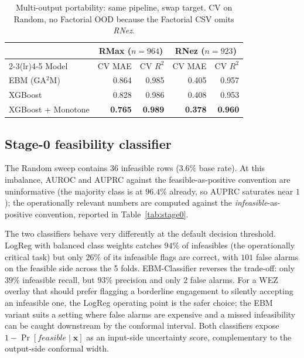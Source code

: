 \documentclass[conference]{IEEEtran}
\begin{document}
\begin{table}[t]
\centering
\caption{Multi-output portability: same pipeline, swap target. CV on Random, no Factorial OOD because the Factorial CSV omits \textit{RNez}.}
\label{tab:rnez}
\scriptsize
\setlength{\tabcolsep}{4pt}
\begin{tabular}{lrrrr}
\toprule
                  & \multicolumn{2}{c}{RMax ($n{=}964$)} & \multicolumn{2}{c}{RNez ($n{=}923$)} \\
\cmidrule(lr){2-3}\cmidrule(lr){4-5}
Model             & CV MAE & CV $R^2$ & CV MAE & CV $R^2$ \\
\midrule
EBM (GA$^2$M)        & 0.864 & 0.985 & 0.405 & 0.957 \\
XGBoost              & 0.828 & 0.986 & 0.408 & 0.953 \\
XGBoost + Monotone   & \textbf{0.765} & \textbf{0.989} & \textbf{0.378} & \textbf{0.960} \\
\bottomrule
\end{tabular}
\end{table}

\subsection{Stage-0 feasibility classifier}
\label{subsec:stage0}
The Random sweep contains $36$ infeasible rows ($3.6\%$ base rate). At this imbalance, AUROC and AUPRC against the feasible-as-positive convention are uninformative (the majority class is at $96.4\%$ already, so AUPRC saturates near $1$); the operationally relevant numbers are computed against the \emph{infeasible}-as-positive convention, reported in Table~\ref{tab:stage0}.

The two classifiers behave very differently at the default decision threshold. LogReg with balanced class weights catches $94\%$ of infeasibles (the operationally critical task) but only $26\%$ of its infeasible flags are correct, with $101$ false alarms on the feasible side across the 5 folds. EBM-Classifier reverses the trade-off: only $39\%$ infeasible recall, but $93\%$ precision and only $2$ false alarms. For a WEZ overlay that should prefer flagging a borderline engagement to silently accepting an infeasible one, the LogReg operating point is the safer choice; the EBM variant suits a setting where false alarms are expensive and a missed infeasibility can be caught downstream by the conformal interval. Both classifiers expose $1 - \Pr[\textit{feasible}\mid\mathbf{x}]$ as an input-side uncertainty score, complementary to the output-side conformal width.
\end{document}
